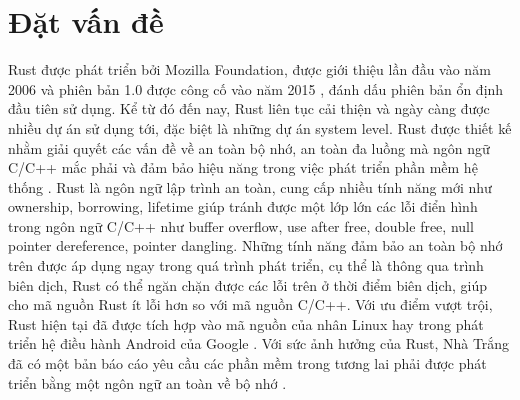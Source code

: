 \chapter{Đặt vấn đề}
\label{chap:introduction}

Rust được phát triển bởi Mozilla Foundation, được giới thiệu lần đầu vào năm 2006 và phiên bản 1.0 được công cố vào năm 2015 \cite{seidel2024bringing}, đánh dấu phiên bản ổn định đầu tiên sử dụng.
Kể từ đó đến nay, Rust liên tục cải thiện và ngày càng được nhiều dự án sử dụng tới, đặc biệt là những dự án system level.
Rust được thiết kế nhằm giải quyết các vấn đề về an toàn bộ nhớ, an toàn đa luồng mà ngôn ngữ C/C++ mắc phải và đảm bảo hiệu năng trong việc phát triển phần mềm hệ thống \cite{je2020scientists, stackoverflowStackOverflow}.
Rust là ngôn ngữ lập trình an toàn, cung cấp nhiều tính năng mới như ownership, borrowing, lifetime giúp tránh được một lớp lớn các lỗi điển hình trong ngôn ngữ C/C++ như buffer overflow, use after free, double free, null pointer dereference, pointer dangling.
Những tính năng đảm bảo an toàn bộ nhớ trên được áp dụng ngay trong quá trình phát triển, cụ thể là thông qua trình biên dịch, Rust có thể ngăn chặn được các lỗi trên ở thời điểm biên dịch, giúp cho mã nguồn Rust ít lỗi hơn so với mã nguồn C/C++.
Với ưu điểm vượt trội, Rust hiện tại đã được tích hợp vào mã nguồn của nhân Linux \cite{kernelRustx2014} hay trong phát triển hệ điều hành Android của Google \cite{androidAndroidRust, googleblogMemorySafe}.
Với sức ảnh hưởng của Rust, Nhà Trắng đã có một bản báo cáo yêu cầu các phần mềm trong tương lai phải được phát triển bằng một ngôn ngữ an toàn về bộ nhớ \cite{whitehousePressRelease}.

